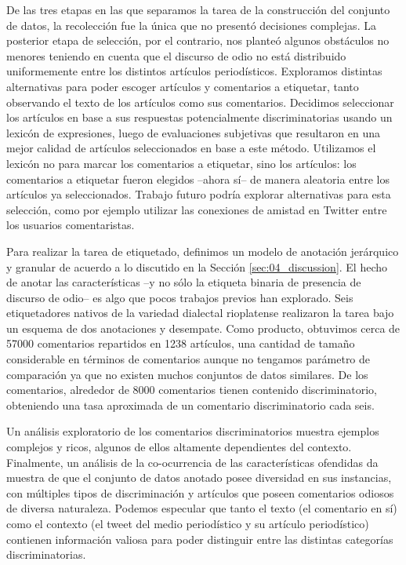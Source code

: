De las tres etapas en las que separamos la tarea de la construcción del conjunto de datos, la recolección fue la única que no presentó decisiones complejas. La posterior etapa de selección, por el contrario, nos planteó algunos obstáculos no menores teniendo en cuenta que el discurso de odio no está distribuido uniformemente entre los distintos artículos periodísticos. Exploramos distintas alternativas para poder escoger artículos y comentarios a etiquetar, tanto observando el texto de los artículos como sus comentarios. Decidimos seleccionar los artículos en base a sus respuestas potencialmente discriminatorias usando un lexicón de expresiones, luego de evaluaciones subjetivas que resultaron en una mejor calidad de artículos seleccionados en base a este método. Utilizamos el lexicón no para marcar los comentarios a etiquetar, sino los artículos: los comentarios a etiquetar fueron elegidos --ahora sí-- de manera aleatoria entre los artículos ya seleccionados. Trabajo futuro podría explorar alternativas para esta selección, como por ejemplo utilizar las conexiones de amistad en Twitter entre los usuarios comentaristas.

Para realizar la tarea de etiquetado, definimos un modelo de anotación jerárquico y granular de acuerdo a lo discutido en la Sección \ref{sec:04_discussion}. El hecho de anotar las características --y no sólo la etiqueta binaria de presencia de discurso de odio-- es algo que pocos trabajos previos han explorado. Seis etiquetadores nativos de la variedad dialectal rioplatense realizaron la tarea bajo un esquema de dos anotaciones y desempate. Como producto, obtuvimos cerca de \num{57000} comentarios repartidos en \num{1238} artículos, una cantidad de tamaño considerable en términos de comentarios aunque no tengamos parámetro de comparación ya que no existen muchos conjuntos de datos similares. De los comentarios, alrededor de \num{8000} comentarios tienen contenido discriminatorio, obteniendo una tasa aproximada de un comentario discriminatorio cada seis.


Un análisis exploratorio de los comentarios discriminatorios muestra ejemplos complejos y ricos, algunos de ellos altamente dependientes del contexto. Finalmente, un análisis de la co-ocurrencia de las características ofendidas da muestra de que el conjunto de datos anotado posee diversidad en sus instancias, con múltiples tipos de discriminación y artículos que poseen comentarios odiosos de diversa naturaleza. Podemos especular que tanto el texto (el comentario en sí) como el contexto (el tweet del medio periodístico y su artículo periodístico) contienen información valiosa para poder distinguir entre las distintas categorías discriminatorias.


